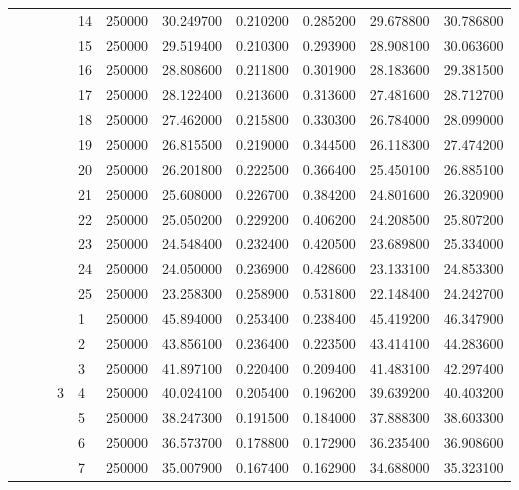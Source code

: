 \begin{tabular}{llllllrrrrr}
\cline{5-11}
 &  &  &  & 14 & 250000 & 30.249700 & 0.210200 & 0.285200 & 29.678800 & 30.786800 \\
\cline{5-11}
 &  &  &  & 15 & 250000 & 29.519400 & 0.210300 & 0.293900 & 28.908100 & 30.063600 \\
\cline{5-11}
 &  &  &  & 16 & 250000 & 28.808600 & 0.211800 & 0.301900 & 28.183600 & 29.381500 \\
\cline{5-11}
 &  &  &  & 17 & 250000 & 28.122400 & 0.213600 & 0.313600 & 27.481600 & 28.712700 \\
\cline{5-11}
 &  &  &  & 18 & 250000 & 27.462000 & 0.215800 & 0.330300 & 26.784000 & 28.099000 \\
\cline{5-11}
 &  &  &  & 19 & 250000 & 26.815500 & 0.219000 & 0.344500 & 26.118300 & 27.474200 \\
\cline{5-11}
 &  &  &  & 20 & 250000 & 26.201800 & 0.222500 & 0.366400 & 25.450100 & 26.885100 \\
\cline{5-11}
 &  &  &  & 21 & 250000 & 25.608000 & 0.226700 & 0.384200 & 24.801600 & 26.320900 \\
\cline{5-11}
 &  &  &  & 22 & 250000 & 25.050200 & 0.229200 & 0.406200 & 24.208500 & 25.807200 \\
\cline{5-11}
 &  &  &  & 23 & 250000 & 24.548400 & 0.232400 & 0.420500 & 23.689800 & 25.334000 \\
\cline{5-11}
 &  &  &  & 24 & 250000 & 24.050000 & 0.236900 & 0.428600 & 23.133100 & 24.853300 \\
\cline{5-11}
 &  &  &  & 25 & 250000 & 23.258300 & 0.258900 & 0.531800 & 22.148400 & 24.242700 \\
\cline{4-11} \cline{5-11}
 &  &  & \multirow[t]{25}{*}{3} & 1 & 250000 & 45.894000 & 0.253400 & 0.238400 & 45.419200 & 46.347900 \\
\cline{5-11}
 &  &  &  & 2 & 250000 & 43.856100 & 0.236400 & 0.223500 & 43.414100 & 44.283600 \\
\cline{5-11}
 &  &  &  & 3 & 250000 & 41.897100 & 0.220400 & 0.209400 & 41.483100 & 42.297400 \\
\cline{5-11}
 &  &  &  & 4 & 250000 & 40.024100 & 0.205400 & 0.196200 & 39.639200 & 40.403200 \\
\cline{5-11}
 &  &  &  & 5 & 250000 & 38.247300 & 0.191500 & 0.184000 & 37.888300 & 38.603300 \\
\cline{5-11}
 &  &  &  & 6 & 250000 & 36.573700 & 0.178800 & 0.172900 & 36.235400 & 36.908600 \\
\cline{5-11}
 &  &  &  & 7 & 250000 & 35.007900 & 0.167400 & 0.162900 & 34.688000 & 35.323100 \\

\end{tabular}
